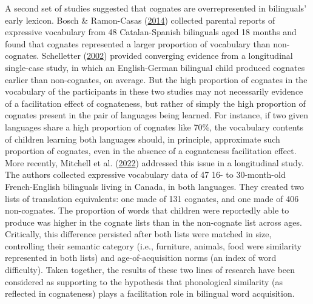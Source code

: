 \documentclass[
]{article}
\begin{document}
A second set of studies suggested that cognates are overrepresented in
bilinguals' early lexicon. Bosch \& Ramon-Casas
(\protect\hyperlink{ref-bosch2014first}{2014}) collected parental
reports of expressive vocabulary from 48 Catalan-Spanish bilinguals aged
18 months and found that cognates represented a larger proportion of
vocabulary than non-cognates. Schelletter
(\protect\hyperlink{ref-schelletter2002effect}{2002}) provided
converging evidence from a longitudinal single-case study, in which an
English-German bilingual child produced cognates earlier than
non-cognates, on average. But the high proportion of cognates in the
vocabulary of the participants in these two studies may not necessarily
evidence of a facilitation effect of cognateness, but rather of simply
the high proportion of cognates present in the pair of languages being
learned. For instance, if two given languages share a high proportion of
cognates like 70\%, the vocabulary contents of children learning both
languages should, in principle, approximate such proportion of cognates,
even in the absence of a cognateness facilitation effect. More recently,
Mitchell et al. (\protect\hyperlink{ref-mitchell2022cognates}{2022})
addressed this issue in a longitudinal study. The authors collected
expressive vocabulary data of 47 16- to 30-month-old French-English
bilinguals living in Canada, in both languages. They created two lists
of translation equivalents: one made of 131 cognates, and one made of
406 non-cognates. The proportion of words that children were reportedly
able to produce was higher in the cognate lists than in the non-cognate
list across ages. Critically, this difference persisted after both lists
were matched in size, controlling their semantic category (i.e.,
furniture, animals, food were similarity represented in both lists) and
age-of-acquisition norms (an index of word difficulty). Taken together,
the results of these two lines of research have been considered as
supporting to the hypothesis that phonological similarity (as reflected
in cognateness) plays a facilitation role in bilingual word acquisition.
\end{document}
